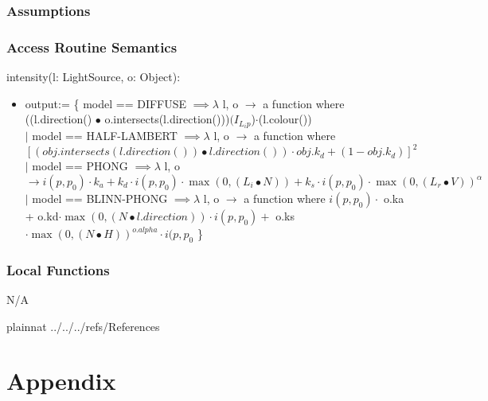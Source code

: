 \documentclass[12pt, titlepage]{article}
\begin{document}
\subsubsection{Assumptions}

\subsubsection{Access Routine Semantics}
\noindent intensity(l: LightSource, o: Object):
\begin{itemize}
	\item output:= \{ model == DIFFUSE $\implies \lambda$ l, o $\to$ a function 
	where ((l.direction() $\bullet$ 
	o.intersects(l.direction()))$(I_{L_{i}p}$)$\cdot$(l.colour())\\
	$|$ model == HALF-LAMBERT $\implies \lambda$ l, o $\to$ a function 
	where  $[(obj.intersects(l.direction()) \bullet l.direction())\cdot 
	obj.k_{d} + (1-obj.k_{d})]^2$\\
	$|$ model == PHONG $\implies \lambda$ l, o $\to i(p,p_{0}) \cdot k_{a} + 
	k_{d}\cdot i(p,p_{0}) \cdot 
	\max(0,(L_{i}\bullet N)) + k_{s}\cdot i(p,p_{0}) \cdot \max(0, 
	({L_{r}}\bullet V))^\alpha$\\
	$|$ model == BLINN-PHONG $\implies \lambda$ l, o $\to$ a function where 
	$i(p,p_{0}) \cdot$ o.ka + o.kd$\cdot \max(0, (N \bullet 
	l.direction))\cdot i(p,p_{0}) +$ o.ks $\cdot \max(0, (N \bullet 
	H))^{o.alpha} \cdot	i(p,p_{0}$
	\}
\end{itemize}


\subsubsection{Local Functions}
N/A

\newpage

 {plainnat}
 {../../../refs/References}

\newpage

\section{Appendix} \label{Appendix}

\end{document}
